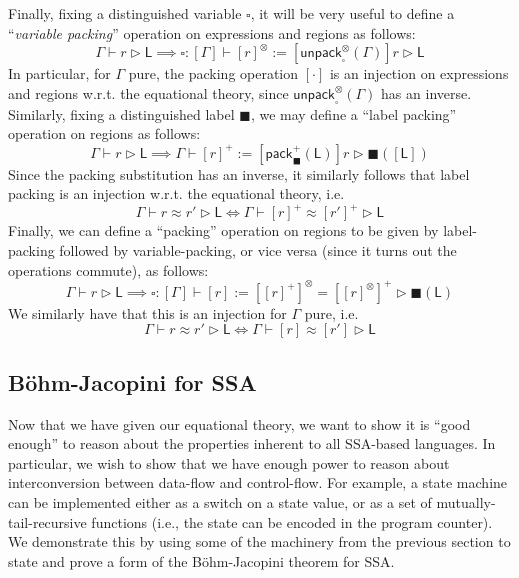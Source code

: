 \documentclass[acmsmall,screen,review]{acmart}
\newcommand{\ms}[1]{\ensuremath{\mathsf{#1}}}
\newcommand{\haslb}[3]{#1 \vdash #2 \rhd #3}
\newcommand{\teqv}{\approx}
\newcommand{\lbeq}[4]{#1 \vdash #2 \teqv #3 \rhd {#4}}
\newcommand{\invar}{\square}
\newcommand{\outlb}{\blacksquare}
\begin{document}
Finally, fixing a distinguished variable $\invar$, it will be very useful to define 
a ``\emph{variable packing}'' operation on expressions and regions as follows:
\begin{equation}
  \haslb{\Gamma}{r}{\ms{L}} \implies 
  \haslb{\invar : [\Gamma]}{[r]^\otimes := [\ms{unpack}_{\invar}^\otimes(\Gamma)]r}{\ms{L}}
\end{equation}
In particular, for $\Gamma$ pure, the packing operation $[\cdot]$ is an injection on expressions and
regions w.r.t. the equational theory, since $\ms{unpack}_{\invar}^\otimes(\Gamma)$ has an inverse.
Similarly, fixing a distinguished label $\outlb$, we may define a ``label packing'' operation on
regions as follows:
\begin{equation}
  \haslb{\Gamma}{r}{\ms{L}} \implies 
  \haslb{\Gamma}{[r]^+ := [\ms{pack}_{\outlb}^+(\ms{L})]r}{\outlb([\ms{L}])}
\end{equation}
Since the packing substitution has an inverse, it similarly follows that label packing is an
injection w.r.t. the equational theory, i.e.
\begin{equation}
  \lbeq{\Gamma}{r}{r'}{\ms{L}} \iff \lbeq{\Gamma}{[r]^+}{[r']^+}{\ms{L}}
\end{equation}
Finally, we can define a ``packing'' operation on regions to be given by label-packing followed by
variable-packing, or vice versa (since it turns out the operations commute), as follows:
\begin{equation}
  \haslb{\Gamma}{r}{\ms{L}} \implies 
  \haslb{\invar : [\Gamma]}{[r] := [[r]^+]^\otimes = [[r]^\otimes]^+}{\outlb(\ms{L})}
\end{equation}
We similarly have that this is an injection for $\Gamma$ pure, i.e.
\begin{equation}
  \lbeq{\Gamma}{r}{r'}{\ms{L}} \iff \lbeq{\Gamma}{[r]}{[r']}{\ms{L}}
\end{equation}

\subsection{B\"ohm-Jacopini for SSA}

\label{ssec:data-control}

Now that we have given our equational theory, we want to show it is ``good enough'' to reason about
the properties inherent to all SSA-based languages. In particular, we
wish to show that we have enough power to reason about interconversion between data-flow and
control-flow. For example, a state machine can be implemented either as a switch on a state value,
or as a set of mutually-tail-recursive functions (i.e., the state can be encoded in the program
counter). We demonstrate this by using some of the machinery from the previous section to state and prove a form
of the B\"ohm-Jacopini theorem \cite{bohm-jacopini} for SSA.
\end{document}
